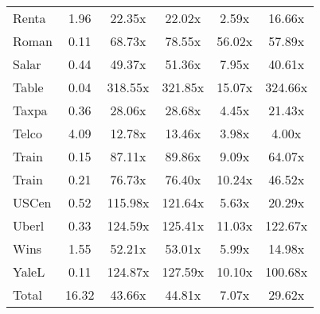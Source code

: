\begin{table}
\begin{tabular}{|l|c|c|c|c|c|}
Renta & 1.96 & 22.35x & 22.02x & 2.59x & 16.66x \\
Roman & 0.11 & 68.73x & 78.55x & 56.02x & 57.89x \\
Salar & 0.44 & 49.37x & 51.36x & 7.95x & 40.61x \\
Table & 0.04 & 318.55x & 321.85x & 15.07x & 324.66x \\
Taxpa & 0.36 & 28.06x & 28.68x & 4.45x & 21.43x \\
Telco & 4.09 & 12.78x & 13.46x & 3.98x & 4.00x \\
Train & 0.15 & 87.11x & 89.86x & 9.09x & 64.07x \\
Train & 0.21 & 76.73x & 76.40x & 10.24x & 46.52x \\
USCen & 0.52 & 115.98x & 121.64x & 5.63x & 20.29x \\
Uberl & 0.33 & 124.59x & 125.41x & 11.03x & 122.67x \\
Wins & 1.55 & 52.21x & 53.01x & 5.99x & 14.98x \\
YaleL & 0.11 & 124.87x & 127.59x & 10.10x & 100.68x \\
Total & 16.32 & 43.66x & 44.81x & 7.07x & 29.62x \\
\bottomrule
\end{tabular}
\end{table}
